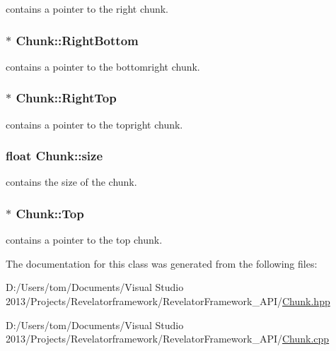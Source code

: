 contains a pointer to the right chunk. 

\hypertarget{class_chunk_afded01a9a67540c9f64dde5776021f4b}{
\subsubsection[{Right\-Bottom}]{$\ast$ Chunk\-::\-Right\-Bottom\hspace{0.3cm}{\ttfamily [private]}}}\label{class_chunk_afded01a9a67540c9f64dde5776021f4b}


contains a pointer to the bottomright chunk. 

\hypertarget{class_chunk_a8a7593c89d4fe5ed193e68b9ed40016b}{
\subsubsection[{Right\-Top}]{$\ast$ Chunk\-::\-Right\-Top\hspace{0.3cm}{\ttfamily [private]}}}\label{class_chunk_a8a7593c89d4fe5ed193e68b9ed40016b}


contains a pointer to the topright chunk. 

\hypertarget{class_chunk_af46410b580baf2985b01044d5c041b2e}{
\subsubsection[{size}]{\setlength{\rightskip}{0pt plus 5cm}float Chunk\-::size\hspace{0.3cm}{\ttfamily [private]}}}\label{class_chunk_af46410b580baf2985b01044d5c041b2e}


contains the size of the chunk. 

\hypertarget{class_chunk_ae841d5ab24dfa5ef8865cb4fa05d089d}{
\subsubsection[{Top}]{$\ast$ Chunk\-::\-Top\hspace{0.3cm}{\ttfamily [private]}}}\label{class_chunk_ae841d5ab24dfa5ef8865cb4fa05d089d}


contains a pointer to the top chunk. 



The documentation for this class was generated from the following files\-:\begin{DoxyCompactItemize}
\item 
D\-:/\-Users/tom/\-Documents/\-Visual Studio 2013/\-Projects/\-Revelatorframework/\-Revelator\-Framework\-\_\-\-A\-P\-I/\hyperlink{_chunk_8hpp}{Chunk.\-hpp}\item 
D\-:/\-Users/tom/\-Documents/\-Visual Studio 2013/\-Projects/\-Revelatorframework/\-Revelator\-Framework\-\_\-\-A\-P\-I/\hyperlink{_chunk_8cpp}{Chunk.\-cpp}\end{DoxyCompactItemize}
